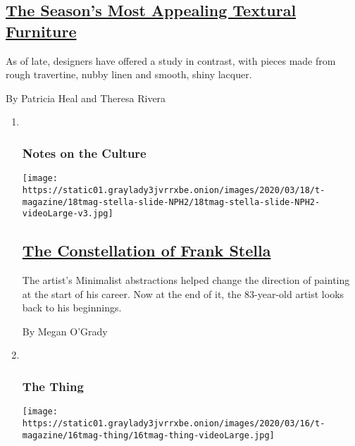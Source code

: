 \begin{enumerate}
  \hypertarget{the-seasons-most-appealing-textural-furniture}{%
  \subsection{\texorpdfstring{\href{/2020/03/09/t-magazine/textural-furniture.html}{The
  Season's Most Appealing Textural
  Furniture}}{The Season's Most Appealing Textural Furniture}}\label{the-seasons-most-appealing-textural-furniture}}

  As of late, designers have offered a study in contrast, with pieces
  made from rough travertine, nubby linen and smooth, shiny lacquer.

  By Patricia Heal and Theresa Rivera
\end{enumerate}

\begin{enumerate}
\def\labelenumi{\arabic{enumi}.}
\item ~
  \hypertarget{notes-on-the-culture-1}{%
  \subsubsection{Notes on the Culture}\label{notes-on-the-culture-1}}

  \texttt{[image: https://static01.graylady3jvrrxbe.onion/images/2020/03/18/t-magazine/18tmag-stella-slide-NPH2/18tmag-stella-slide-NPH2-videoLarge-v3.jpg]}

  \hypertarget{the-constellation-of-frank-stella}{%
  \subsection{\texorpdfstring{\href{/2020/03/18/t-magazine/frank-stella.html}{The
  Constellation of Frank
  Stella}}{The Constellation of Frank Stella}}\label{the-constellation-of-frank-stella}}

  The artist's Minimalist abstractions helped change the direction of
  painting at the start of his career. Now at the end of it, the
  83-year-old artist looks back to his beginnings.

  By Megan O'Grady
\item ~
  \hypertarget{the-thing}{%
  \subsubsection{The Thing}\label{the-thing}}

  \texttt{[image: https://static01.graylady3jvrrxbe.onion/images/2020/03/16/t-magazine/16tmag-thing/16tmag-thing-videoLarge.jpg]}


\end{enumerate}
